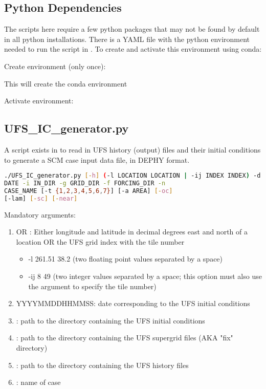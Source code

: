 \subsection{Python Dependencies}
\label{subsection: pydepend}
The scripts here require a few python packages that may not be found by default in all python installations. There is a YAML file with the python environment needed to run the script in . To create and activate this environment using conda:

Create environment (only once):


This will create the conda environment 


Activate environment:



\subsection{UFS\_IC\_generator.py}
\label{subsection: ufsicgenerator}
A script exists in  to read in UFS history (output) files and their initial conditions to generate a SCM case input data file, in DEPHY format. 


\begin{lstlisting}[language=bash]
./UFS_IC_generator.py [-h] (-l LOCATION LOCATION | -ij INDEX INDEX) -d
DATE -i IN_DIR -g GRID_DIR -f FORCING_DIR -n
CASE_NAME [-t {1,2,3,4,5,6,7}] [-a AREA] [-oc]
[-lam] [-sc] [-near]
\end{lstlisting}

Mandatory arguments:
\begin{enumerate}
\item {} OR :  Either longitude and latitude in decimal degrees east and north of a location OR the UFS grid index with the tile number
	\begin{itemize}
		\item -l 261.51 38.2 (two floating point values separated by a space)
		\item -ij 8 49 (two integer values separated by a space; this option must also use the  argument to specify the tile number)
	\end{itemize}
\item {} YYYYMMDDHHMMSS: date corresponding to the UFS initial conditions
\item {}: path to the directory containing the UFS initial conditions
\item {}: path to the directory containing the UFS supergrid files (AKA "fix" directory)
\item {}: path to the directory containing the UFS history files
\item {}: name of case
\end{enumerate}

